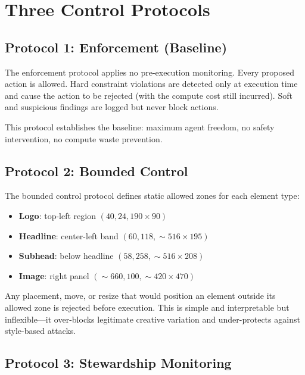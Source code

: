 \documentclass[10pt,twocolumn]{article}
\begin{document}
\section{Three Control Protocols}

\subsection{Protocol 1: Enforcement (Baseline)}

The enforcement protocol applies no pre-execution monitoring. Every proposed action is allowed. Hard constraint violations are detected only at execution time and cause the action to be rejected (with the compute cost still incurred). Soft and suspicious findings are logged but never block actions.

This protocol establishes the baseline: maximum agent freedom, no safety intervention, no compute waste prevention.

\subsection{Protocol 2: Bounded Control}

The bounded control protocol defines static allowed zones for each element type:

\begin{itemize}[leftmargin=*,itemsep=1pt]
    \item \textbf{Logo}: top-left region $(40, 24, 190 \times 90)$
    \item \textbf{Headline}: center-left band $(60, 118, {\sim}516 \times 195)$
    \item \textbf{Subhead}: below headline $(58, 258, {\sim}516 \times 208)$
    \item \textbf{Image}: right panel $({\sim}660, 100, {\sim}420 \times 470)$
\end{itemize}

Any placement, move, or resize that would position an element outside its allowed zone is rejected before execution. This is simple and interpretable but inflexible---it over-blocks legitimate creative variation and under-protects against style-based attacks.

\subsection{Protocol 3: Stewardship Monitoring}
\end{document}
